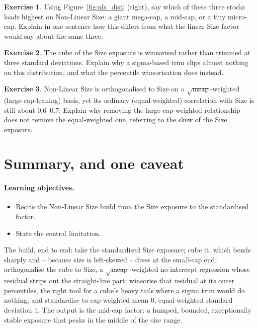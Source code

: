\documentclass[11pt]{article}
\theoremstyle{definition}
\newtheorem{exercise}{Exercise}[section]
\theoremstyle{plain}
\theoremstyle{remark}
\begin{document}
\begin{exercise}
Using Figure~\ref{fig:nls_dist} (right), say which of these three stocks loads highest on Non-Linear Size: a giant mega-cap, a mid-cap, or a tiny micro-cap. Explain in one sentence how this differs from what the linear Size factor would say about the same three.
\end{exercise}

\begin{exercise}
The cube of the Size exposure is winsorised rather than trimmed at three standard deviations. Explain why a sigma-based trim clips almost nothing on this distribution, and what the percentile winsorisation does instead.
\end{exercise}

\begin{exercise}
Non-Linear Size is orthogonalised to Size on a $\sqrt{\text{mcap}}$-weighted (large-cap-leaning) basis, yet its ordinary (equal-weighted) correlation with Size is still about $0.6$--$0.7$. Explain why removing the large-cap-weighted relationship does not remove the equal-weighted one, referring to the skew of the Size exposure.
\end{exercise}

\section{Summary, and one caveat}\label{sec:summary}

\paragraph{Learning objectives.}
\begin{itemize}[leftmargin=1.4em,topsep=2pt]
  \item Recite the Non-Linear Size build from the Size exposure to the standardised factor.
  \item State the central limitation.
\end{itemize}

The build, end to end: take the standardised Size exposure; cube it, which bends sharply and -- because size is left-skewed -- dives at the small-cap end; orthogonalise the cube to Size, a $\sqrt{\text{mcap}}$-weighted no-intercept regression whose residual strips out the straight-line part; winsorise that residual at its outer percentiles, the right tool for a cube's heavy tails where a sigma trim would do nothing; and standardise to cap-weighted mean $0$, equal-weighted standard deviation $1$. The output is the mid-cap factor: a humped, bounded, exceptionally stable exposure that peaks in the middle of the size range.
\end{document}
